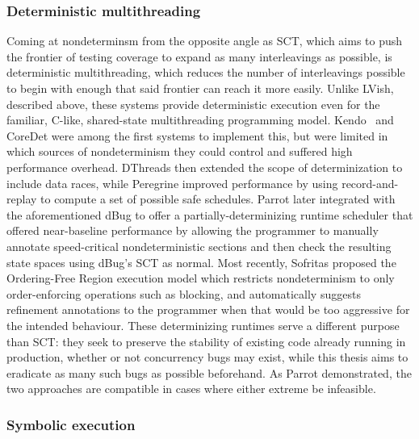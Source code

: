 \subsubsection{Deterministic multithreading}

Coming at nondeterminsm from the opposite angle as SCT,
which aims to push the frontier of testing coverage to expand as many interleavings as possible,
is deterministic multithreading,
which reduces the number of interleavings possible to begin with enough that said frontier can reach it more easily.
Unlike LVish, described above, these systems provide deterministic execution
even for the familiar, C-like, shared-state multithreading programming model.
Kendo~\cite{kendo} and CoreDet \cite{coredet} were among the first systems to implement this,
but were limited in which sources of nondeterminism they could control
and suffered high performance overhead.
DThreads \cite{dthreads} then extended the scope of determinization to include data races,
while Peregrine \cite{peregrine}
improved performance by using record-and-replay to compute a set of possible safe schedules.
%
Parrot \cite{parrot} later integrated with the aforementioned dBug \cite{dbug-ssv}
to offer a partially-determinizing runtime scheduler
that offered near-baseline performance by allowing the programmer to
manually annotate speed-critical nondeterministic sections
and then check the resulting state spaces using dBug's SCT as normal.
%
Most recently, Sofritas \cite{sofritas}
proposed the Ordering-Free Region execution model
which restricts nondeterminism to only order-enforcing operations such as blocking,
and automatically suggests refinement annotations to the programmer
when that would be too aggressive for the intended behaviour.
These determinizing runtimes serve a different purpose than SCT:
they seek to preserve the stability of existing code already running in production,
whether or not concurrency bugs may exist,
while this thesis aims to eradicate as many such bugs as possible beforehand.
As Parrot demonstrated, the two approaches are compatible in cases where either extreme be infeasible.

\subsubsection{Symbolic execution}

